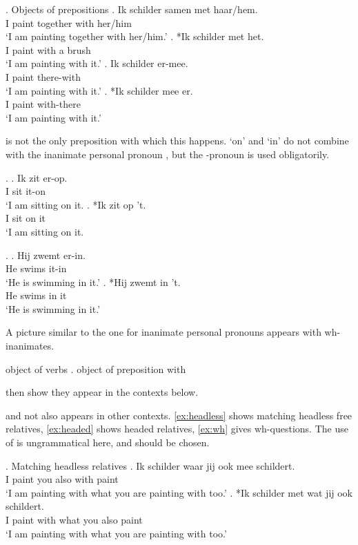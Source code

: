 \documentclass{article}
\begin{document}
\ex. Objects of prepositions \label{ex:objprep}
\ag. Ik schilder samen met haar/hem.\\
 I paint together with her/him\\
 `I am painting together with her/him.'\label{ex:prepani}
\bg. *Ik schilder met het.\\
 I paint with a brush\\
 `I am painting with it.'\label{ex:prephet}
\bg. Ik schilder er-mee.\\
 I paint there-with\\
 `I am painting with it.'\label{ex:preper}
\bg. *Ik schilder mee er.\\
 I paint with-there\\
 `I am painting with it.'\label{ex:erprep}

 is not the only preposition with which this happens.  `on' and  `in' do not combine with the inanimate personal pronoun , but the -pronoun is used obligatorily.

\ex.
\ag. Ik zit er-op.\\
 I sit it-on\\
 `I am sitting on it.
\bg. *Ik zit op 't.\\
 I sit on it\\
 `I am sitting on it.

\ex.
 \ag. Hij zwemt er-in.\\
  He swims it-in\\
  `He is swimming in it.'
 \bg. *Hij zwemt in 't.\\
  He swims in it\\
  `He is swimming in it.'

A picture similar to the one for inanimate personal pronouns appears with wh-inanimates.

object of verbs .
object of preposition with 


then show they appear in the contexts below.

 and not  also appears in other contexts. \ref{ex:headless} shows matching headless free relatives, \ref{ex:headed} shows headed relatives, \ref{ex:wh} gives wh-questions. The use of  is ungrammatical here, and  should be chosen.

\ex. Matching headless relatives\label{ex:headless}
\ag. Ik schilder waar jij ook mee schildert.\\
 I paint  you also with paint\\
 `I am painting with what you are painting with too.'
\bg. *Ik schilder met wat jij ook schildert.\\
 I paint with what you also paint\\
 `I am painting with what you are painting with too.'
\end{document}
